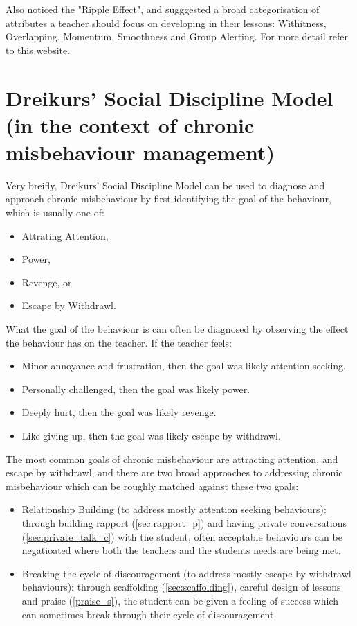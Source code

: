 \documentclass[12pt]{report}
\begin{document}
Also noticed the "Ripple Effect", and sugggested a broad categorisation of attributes a teacher should focus on developing in their lessons: Withitness, Overlapping, Momentum, Smoothness and Group Alerting. For more detail refer to \href{http://universityofhullscitts.org.uk/scitts/site/pt/behaviour/kounin.html}{this website}.

\section{Dreikurs' Social Discipline Model (in the context of chronic misbehaviour management)}
\label{sec:dreikur_theory}

Very breifly, Dreikurs' Social Discipline Model can be used to diagnose and approach chronic misbehaviour by first identifying the goal of the behaviour, which is usually one of:
\begin{itemize}
  \item Attrating Attention,
  \item Power,
  \item Revenge, or
  \item Escape by Withdrawl.
\end{itemize}
What the goal of the behaviour is can often be diagnosed by observing the effect the behaviour has on the teacher. If the teacher feels:
\begin{itemize}
  \item Minor annoyance and frustration, then the goal was likely attention seeking.
  \item Personally challenged, then the goal was likely power. 
  \item Deeply hurt, then the goal was likely revenge.
  \item Like giving up, then the goal was likely escape by withdrawl.
\end{itemize}
The most common goals of chronic misbehaviour are attracting attention, and escape by withdrawl, and there are two broad approaches to addressing chronic misbehaviour which can be roughly matched against these two goals:
\begin{itemize}
  \item Relationship Building (to address mostly attention seeking behaviours): through building rapport (\ref{sec:rapport_p}) and having private conversations (\ref{sec:private_talk_c}) with the student, often acceptable behaviours can be negatioated where both the teachers and the students needs are being met.
  \item Breaking the cycle of discouragement (to address mostly escape by withdrawl behaviours): through scaffolding (\ref{sec:scaffolding}), careful design of lessons and praise (\ref{praise_s}), the student can be given a feeling of success which can sometimes break through their cycle of discouragement.
\end{itemize}
  
\end{document}
